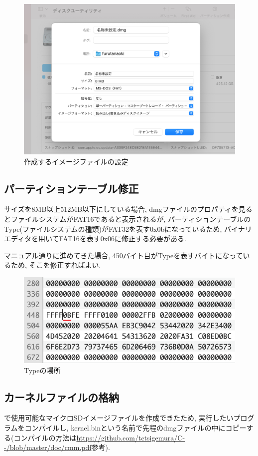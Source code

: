 \begin{figure}[H]
    \centering
    \includegraphics[width=13.5cm]{"figs/appA-diskutil.png"}
    \caption{作成するイメージファイルの設定} \label{fig:appA-diskutil}
\end{figure}

\subsection{パーティションテーブル修正}

サイズを8MB以上512MB以下にしている場合, dmgファイルのプロパティを見るとファイルシステムがFAT16であると表示されるが, パーティションテーブルのType(ファイルシステムの種類)がFAT32を表す0x0bになっているため, バイナリエディタを用いてFAT16を表す0x06に修正する必要がある. 

マニュアル通りに進めてきた場合, 450バイト目がTypeを表すバイトになっているため, そこを修正すればよい.

\begin{figure}[H]
    \centering
    \includegraphics[width=12cm]{"figs/appA-binaryEditor.png"}
    \caption{Typeの場所} \label{fig:appA-binedit}
\end{figure}

\subsection{カーネルファイルの格納}

\tacsim で使用可能なマイクロSDイメージファイルを作成できたため, 実行したいプログラムをコンパイルし, kernel.binという名前で先程のdmgファイルの中にコピーする(コンパイルの方法は\url{https://github.com/tctsigemura/C--/blob/master/doc/cmm.pdf}参考).
